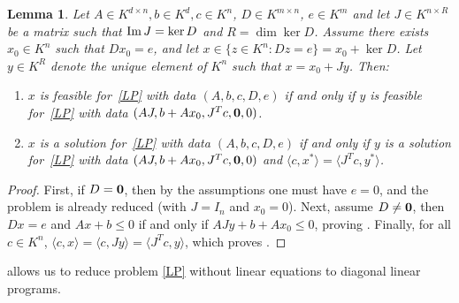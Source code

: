 \documentclass[sigconf]{acmart}
\newtheorem{lemma}[theorem]{Lemma}
\newcommand{\OK}{\mathcal{O}_K}
\begin{document}
\begin{lemma}\label{reducD}
  Let $A \in K^{d \times n}, b \in K^d, c\in K^n$, $D \in K^{m\times n}$,
  $e \in K^m$ and let $J \in K^{n \times R}$ be a matrix such that
  ${\rm Im}\, J = \ker D$ and $R = \dim \ker D$.
  Assume there exists $x_0 \in K^n$ such that $D x_0 = e$, and let
  $x \in \{z \in K^n : Dz = e\} = x_0 + \ker D$.
  Let $y \in K^R$ denote the unique element of $K^n$ such that
  $x = x_0 + J y$. Then:
  \begin{enumerate}
  \item\label{reducD_item1}
    $x$ is feasible for~\eqref{LP} with data $(A,b,c,D,e)$ if and only if 
    $y$ is feasible for~\eqref{LP} with data $(AJ,b+A x_0,J^T c,{\bf 0},0)$.
  \item\label{reducD_item2}
    $x$ is a solution for~\eqref{LP} with data $(A,b,c,D,e)$ if and only if 
    $y$ is a solution for~\eqref{LP} with data $(AJ,b+A x_0,J^T c,{\bf 0},0)$ and
    $\langle c,x^* \rangle = \langle J^T c,y^* \rangle$.
  \end{enumerate}
\end{lemma}
\begin{proof}
  First, if $D={\bf 0}$, then by the assumptions one must have $e=0$, and the problem
  is already reduced (with $J=I_n$ and $x_0=0$).
  Next, assume $D\neq{\bf 0}$, then $Dx=e$ and $Ax + b \le 0$ if and only if
  $AJy + b+Ax_0 \le 0$, proving . Finally, for all
  $c \in K^n$, $\langle c,x\rangle = \langle c, Jy\rangle = \langle J^T c,y\rangle$, which proves .
\end{proof}
 

 allows us to reduce problem \eqref{LP} without linear equations
to diagonal linear programs.
\end{document}
